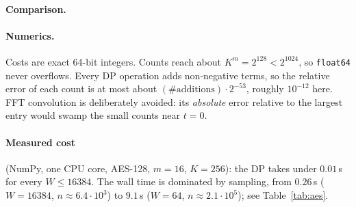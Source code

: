 \paragraph{Comparison.}
\begin{center}\small
{}
\end{center}

\paragraph{Numerics.} Costs are exact 64-bit integers. Counts reach about $K^m=2^{128}<2^{1024}$, so \texttt{float64}
never overflows. Every DP operation adds non-negative terms, so the relative error of each count is
at most about $(\#\text{additions})\cdot2^{-53}$, roughly $10^{-12}$ here. FFT convolution is deliberately avoided: its
\emph{absolute} error relative to the largest entry would swamp the small counts near $t=0$.

\paragraph{Measured cost} (NumPy, one CPU core, AES-128, $m=16$, $K=256$): the DP takes under $0.01$\,s for every
$W\le16384$. The wall time is dominated by sampling, from $0.26$\,s ($W=16384$, $n\approx6.4\cdot10^3$) to $9.1$\,s ($W=64$,
$n\approx2.1\cdot10^5$); see Table~\ref{tab:aes}.
